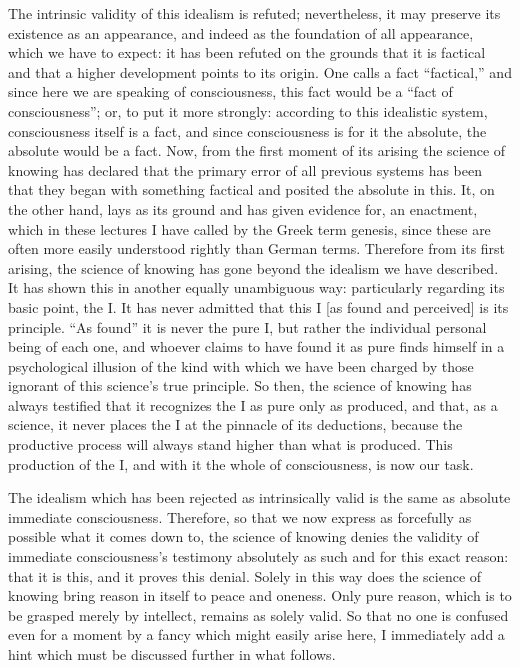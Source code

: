 The intrinsic validity of this idealism is refuted;
nevertheless, it may preserve its existence as an appearance,
and indeed as the foundation of all appearance,
which we have to expect:
it has been refuted on the grounds that it is factical
and that a higher development points to its origin.
One calls a fact “factical,”
and since here we are speaking of consciousness,
this fact would be a “fact of consciousness”;
or, to put it more strongly:
according to this idealistic system,
consciousness itself is a fact,
and since consciousness is for it the absolute,
the absolute would be a fact.
Now, from the first moment of its arising
the science of knowing has declared that the
primary error of all previous systems has been
that they began with something factical
and posited the absolute in this.
It, on the other hand, lays as its ground
and has given evidence for, an enactment,
which in these lectures I have called by the Greek term genesis,
since these are often more easily understood rightly than German terms.
Therefore from its first arising,
the science of knowing has gone beyond the idealism we have described.
It has shown this in another equally unambiguous way:
particularly regarding its basic point, the I.
It has never admitted that this I
[as found and perceived]
is its principle.
“As found” it is never the pure I,
but rather the individual personal being of each one,
and whoever claims to have found it as pure finds himself
in a psychological illusion of the kind
with which we have been charged by those
ignorant of this science's true principle.
So then, the science of knowing has always testified
that it recognizes the I as pure only as produced,
and that, as a science, it never places the I
at the pinnacle of its deductions,
because the productive process will always stand
higher than what is produced.
This production of the I,
and with it the whole of consciousness,
is now our task.

The idealism which has been rejected as intrinsically valid is
the same as absolute immediate consciousness.
Therefore, so that we now express
as forcefully as possible what it comes down to,
the science of knowing denies the validity of
immediate consciousness's testimony absolutely
as such and for this exact reason:
that it is this, and it proves this denial.
Solely in this way does the science of knowing
bring reason in itself to peace and oneness.
Only pure reason, which is to be grasped merely by intellect,
remains as solely valid.
So that no one is confused even for a moment
by a fancy which might easily arise here,
I immediately add a hint which must be discussed
further in what follows.

